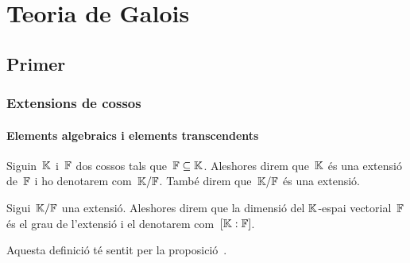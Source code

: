 \documentclass[../Apunts.tex]{subfiles}
\begin{document}
\part{Teoria de Galois}
\chapter[Capítol primer]{Primer}
\section{Extensions de cossos}
\subsection{Elements algebraics i elements transcendents}
	\begin{definition}
		\label{def:extensió d'un cos}
		Siguin~\(\mathbb{K}\) i~\(\mathbb{F}\) dos cossos tals que~\(\mathbb{F}\subseteq\mathbb{K}\). Aleshores direm que~\(\mathbb{K}\) és una extensió de~\(\mathbb{F}\) i ho denotarem com~\(\mathbb{K}/\mathbb{F}\). També direm que~\(\mathbb{K}/\mathbb{F}\) és una extensió.
	\end{definition}
	\begin{definition}
		\label{def:grau d'una extensió}
		Sigui~\(\mathbb{K}/\mathbb{F}\) una extensió. Aleshores direm que la dimensió del \(\mathbb{K}\)-espai vectorial~\(\mathbb{F}\) és el grau de l'extensió i el denotarem com~\([\mathbb{K}:\mathbb{F}]\).
		
		Aquesta definició té sentit per la proposició~.
	\end{definition}
\end{document}

